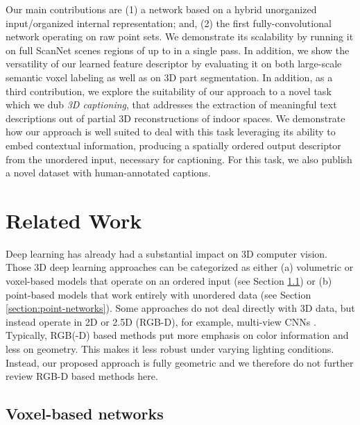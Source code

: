 \documentclass[runningheads]{llncs}
\begin{document}
Our main contributions are (1) a network based on a hybrid unorganized input/organized internal representation; and, (2) the first fully-convolutional network operating on raw point sets. We demonstrate its scalability by running it on full ScanNet scenes regions of up to  in a single pass. In addition, we show the versatility of our learned feature descriptor by evaluating it on both large-scale semantic voxel labeling as well as on 3D part segmentation. In addition, as a third contribution, we explore the suitability of our approach to a novel task which we dub \textit{3D captioning}, that addresses the extraction of meaningful text descriptions out of partial 3D reconstructions of indoor spaces.
We demonstrate how our approach is well suited to deal with this task leveraging its ability to embed contextual information, producing a spatially ordered output descriptor from the unordered input, necessary for captioning. For this task, we also publish a novel dataset with human-annotated captions.



\section{Related Work}

Deep learning has already had a substantial impact on 3D computer vision. Those 3D deep learning approaches can be categorized as either (a) volumetric or voxel-based models that operate on an ordered input (see Section \ref{section:voxel-networks}) or (b) point-based models that work entirely with unordered data (see Section \ref{section:point-networks}).
Some approaches do not deal directly with 3D data, but instead operate in 2D or 2.5D (RGB-D), for example, multi-view CNNs \cite{Su2015,Qi2016,Kaiming2017}. Typically, RGB(-D) based methods put more emphasis on color information and less on geometry. This makes it less robust under varying lighting conditions. Instead, our proposed approach is fully geometric and we therefore do not further review RGB-D based methods here.


\subsection{Voxel-based networks}
\label{section:voxel-networks}
\end{document}
